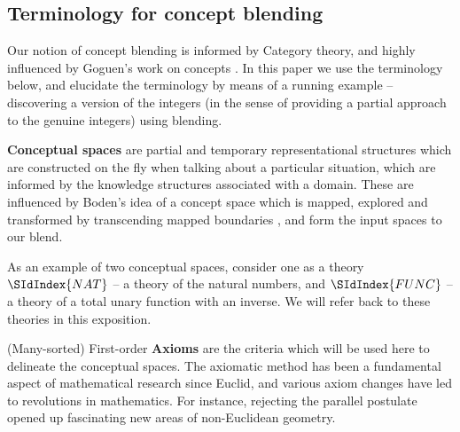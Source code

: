 

\subsection{Terminology for concept blending}
Our notion of concept blending is informed by Category theory, and
highly influenced by Goguen's work on concepts \parencite{Gog05b}. In
this paper we use the terminology below, and elucidate the terminology
by means of a running example -- discovering a version of the integers
(in the sense of providing a partial approach to the genuine integers)
using blending.

{\bf Conceptual spaces} are partial and temporary representational
structures which are constructed on the fly when talking about a
particular situation, which are informed by the knowledge structures
associated with a domain. These are influenced by Boden's idea of a
concept space which is mapped, explored and transformed by
transcending mapped boundaries \parencite{boden}, and form the input spaces
to our blend. 

As an example of two conceptual spaces, consider one as a theory
$\SIdIndex{NAT}$ --
a theory of the natural numbers, and $\SIdIndex{FUNC}$ -- a theory of a total
unary function with an inverse. 
We will refer back to these theories in this exposition.

(Many-sorted) First-order {\bf Axioms} are the criteria which will be
used here to delineate the conceptual
spaces. The axiomatic method has been a fundamental aspect of
mathematical research since Euclid, and various axiom changes have led
to revolutions in mathematics. For instance, 
rejecting
the parallel postulate opened up fascinating new areas of
non-Euclidean geometry.

